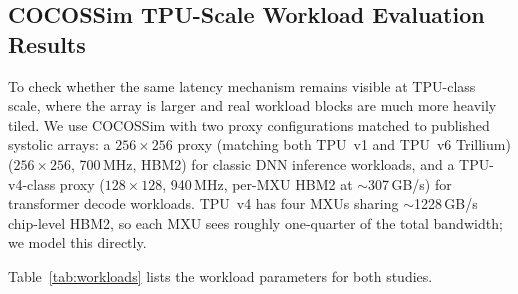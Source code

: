 \subsection{COCOSSim TPU-Scale Workload Evaluation Results}
To check whether the same latency mechanism remains visible at
TPU-class scale, where the array is larger and real workload blocks are
much more heavily tiled. We use COCOSSim with two proxy configurations
matched to published systolic arrays: a $256{\times}256$ proxy (matching both TPU~v1 and TPU~v6 Trillium)
($256\times256$, 700\,MHz, HBM2) for classic DNN inference workloads, and a
TPU-v4-class proxy ($128\times128$, 940\,MHz, per-MXU HBM2 at
${\sim}$307\,GB/s) for transformer decode workloads. TPU~v4 has four MXUs
sharing ${\sim}$1228\,GB/s chip-level HBM2, so each MXU sees roughly one-quarter of the total bandwidth; we model this directly.

Table~\ref{tab:workloads} lists the workload parameters for both studies.

